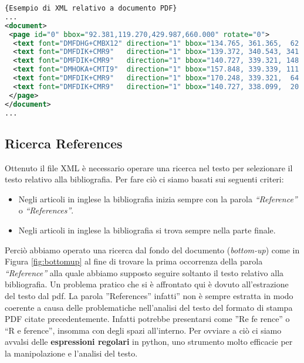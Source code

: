 \begin{lstlisting}[language=XML,frame=r,caption=Esempio di XML relativo a documento PDF ,breaklines=true,basicstyle=\small]{Esempio di XML relativo a documento PDF}
...
<document>
 <page id="0" bbox="92.381,119.270,429.987,660.000" rotate="0">
  <text font="DMFDHG+CMBX12" direction="1" bbox="134.765, 361.365,  62.920, 11.955" size="11.955">References</text>
  <text font="DMFDIK+CMR9"   direction="1" bbox="139.372, 340.543, 341.146,  8.966" size="8.966">1. J.-F. Arias, C.P. Lai, S. Surya, R. Kasturi, and A.K. Chhabra. Interpretation of</text>
  <text font="DMFDIK+CMR9"   direction="1" bbox="140.727, 339.321, 148.241,  8.966" size="8.966">telephone system manhole drawings.</text>
  <text font="DMHOKA+CMTI9"  direction="1" bbox="157.848, 339.339, 111.177,  8.966" size="8.966">Pattern Recognition Letters</text>
  <text font="DMFDIK+CMR9"   direction="1" bbox="170.248, 339.321,  64.383,  8.966" size="8.966">, 16(1):355&#8211;359,</text>
  <text font="DMFDIK+CMR9"   direction="1" bbox="140.727, 338.099,  20.990,  8.966" size="8.966">1995.</text>
 </page>
</document>
...
\end{lstlisting}



\subsection{Ricerca References}

Ottenuto il file XML è necessario operare una ricerca nel testo per selezionare il testo relativo alla bibliografia.
Per fare ciò ci siamo basati sui seguenti criteri:
\begin{itemize}
 \item Negli articoli in inglese la bibliografia inizia sempre con la parola \textit{``Reference''} o \textit{``References''}.
 \item Negli articoli in inglese la bibliografia si trova sempre nella parte finale.
\end{itemize}

Perciò abbiamo operato una ricerca dal fondo del documento (\textit{bottom-up}) come in Figura \ref{fig:bottomup} al fine di trovare la prima occorrenza della parola \textit{``Reference''} alla quale abbiamo supposto seguire soltanto il testo relativo alla bibliografia. 
Un problema pratico che si è affrontato qui è dovuto all'estrazione del testo dal pdf. La parola ''References'' infatti'' non è sempre estratta in modo coerente a causa delle problematiche nell'analisi del testo del formato di stampa PDF citate precedentemente. Infatti potrebbe presentarsi come ''Re fe rence'' o ``R e ference'', insomma con degli spazi all'interno. Per ovviare a ciò ci siamo avvalsi delle\textbf{ espressioni regolari} in python, uno strumento molto efficacie per la manipolazione e l'analisi del testo.

